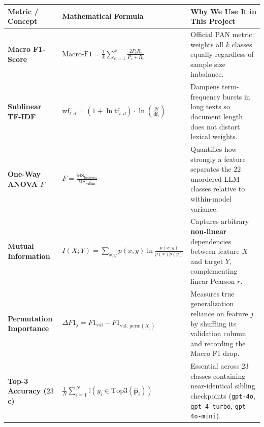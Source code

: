 \documentclass[11pt, a4paper]{article}
\begin{document}
\begin{center}
\renewcommand{\arraystretch}{1.45}
\begin{tabular}{p{} p{} p{}}
\toprule
\textbf{Metric / Concept} & \textbf{Mathematical Formula} & \textbf{Why We Use It in This Project} \\
\midrule
\textbf{Macro F1-Score} & $\displaystyle \text{Macro-F1} = \frac{1}{k}\sum_{c=1}^{k} \frac{2 P_c R_c}{P_c + R_c}$ & Official PAN metric: weights all $k$ classes equally regardless of sample size imbalance. \\
\textbf{Sublinear TF-IDF} & $\displaystyle \text{wf}_{t,d} = (1 + \ln \text{tf}_{t,d}) \cdot \ln\!\left(\frac{N}{\text{df}_t}\right)$ & Dampens term-frequency bursts in long texts so document length does not distort lexical weights. \\
\textbf{One-Way ANOVA $F$} & $\displaystyle F = \frac{\text{MS}_{\text{between}}}{\text{MS}_{\text{within}}}$ & Quantifies how strongly a feature separates the $22$ unordered LLM classes relative to within-model variance. \\
\textbf{Mutual Information} & $\displaystyle I(X;Y) = \sum_{x,y} p(x,y)\ln\frac{p(x,y)}{p(x)p(y)}$ & Captures arbitrary \textbf{non-linear} dependencies between feature $X$ and target $Y$, complementing linear Pearson $r$. \\
\textbf{Permutation Importance} & $\displaystyle \Delta F1_j = F1_{\text{val}} - F1_{\text{val, perm}(X_j)}$ & Measures true generalization reliance on feature $j$ by shuffling its validation column and recording the Macro F1 drop. \\
\textbf{Top-3 Accuracy ($23$c)} & $\displaystyle \frac{1}{N}\sum_{i=1}^{N} \mathbb{I}\!\left(y_i \in \text{Top3}(\hat{\mathbf{p}}_i)\right)$ & Essential across $23$ classes containing near-identical sibling checkpoints (\texttt{gpt-4o}, \texttt{gpt-4-turbo}, \texttt{gpt-4o-mini}). \\
\bottomrule
\end{tabular}
\end{center}
\end{document}
